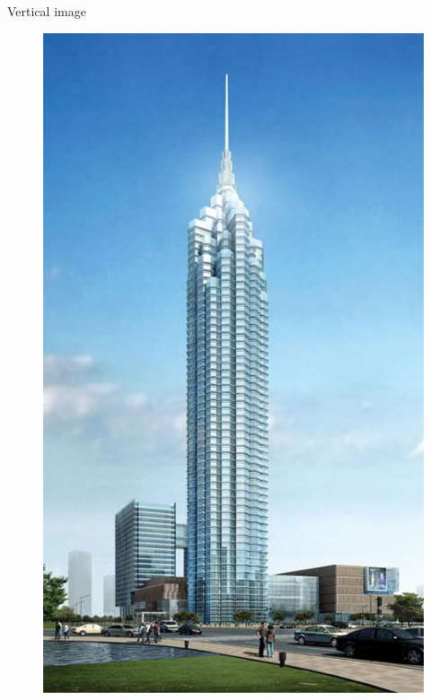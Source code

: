 \begin{frame}{Vertical image}

\begin{figure}[htbp]
\centering
\includegraphics[width=\textwidth,height=0.8\textheight,keepaspectratio]{images/vertical}
\end{figure}

\end{frame}

